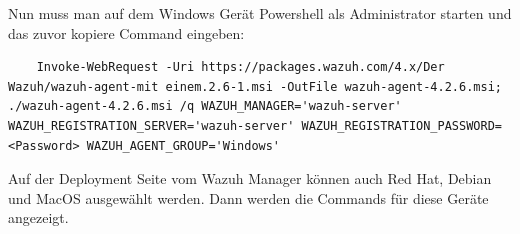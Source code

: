 Nun muss man auf dem Windows Gerät Powershell als Administrator starten und das zuvor kopiere Command eingeben:

\begin{lstlisting}
    Invoke-WebRequest -Uri https://packages.wazuh.com/4.x/Der Wazuh/wazuh-agent-mit einem.2.6-1.msi -OutFile wazuh-agent-4.2.6.msi; ./wazuh-agent-4.2.6.msi /q WAZUH_MANAGER='wazuh-server' WAZUH_REGISTRATION_SERVER='wazuh-server' WAZUH_REGISTRATION_PASSWORD=<Password> WAZUH_AGENT_GROUP='Windows' 
\end{lstlisting}

Auf der Deployment Seite vom Wazuh Manager können auch Red Hat, Debian und MacOS ausgewählt werden.
Dann werden die Commands für diese Geräte angezeigt.